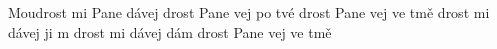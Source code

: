 \begin{TEXT}{Moudrost mi Pane dávej}
\SLOKA {}drost Pane vej  po tvé   \NL
{}drost Pane vej  ve tmě  \NL
{}drost mi dávej  ji m \NL
{}drost mi dávej   dám \NL
{}drost Pane vej  ve tmě  \NL
\end{TEXT}
